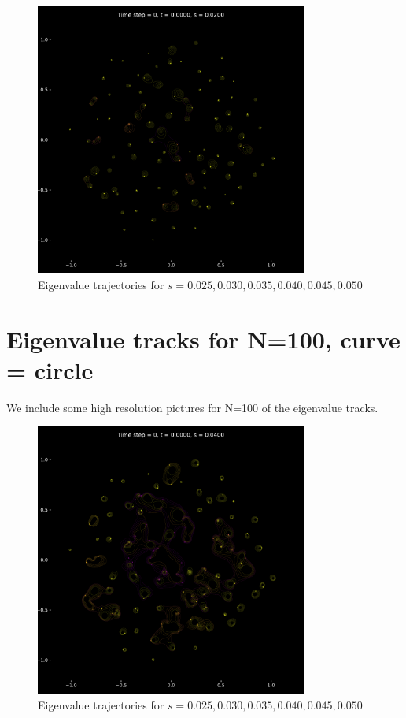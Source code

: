 \documentclass{article}
\begin{document}
	   \begin{figure}[htbp]
		   \centering
		   \includegraphics[width=0.8\textwidth]{figures/frame0to50.pdf}
		   \caption{Eigenvalue trajectories for $s= 0.025, 0.030, 0.035, 0.040, 0.045, 0.050$ }
		   \label{fig:pdf_image}
	   \end{figure}	 

	\section{Eigenvalue tracks for N=100, curve = circle} \label{appendix:N=100}

	We include some high resolution pictures for N=100 of the eigenvalue tracks.

	\newpage

	\begin{figure}[htbp]
		\centering
		\includegraphics[width=0.8\textwidth]{figures/frame50to100.pdf}
		\caption{Eigenvalue trajectories for $s= 0.025, 0.030, 0.035, 0.040, 0.045, 0.050$ }
		\label{fig:pdf_image}
	\end{figure}
	
\end{document}
